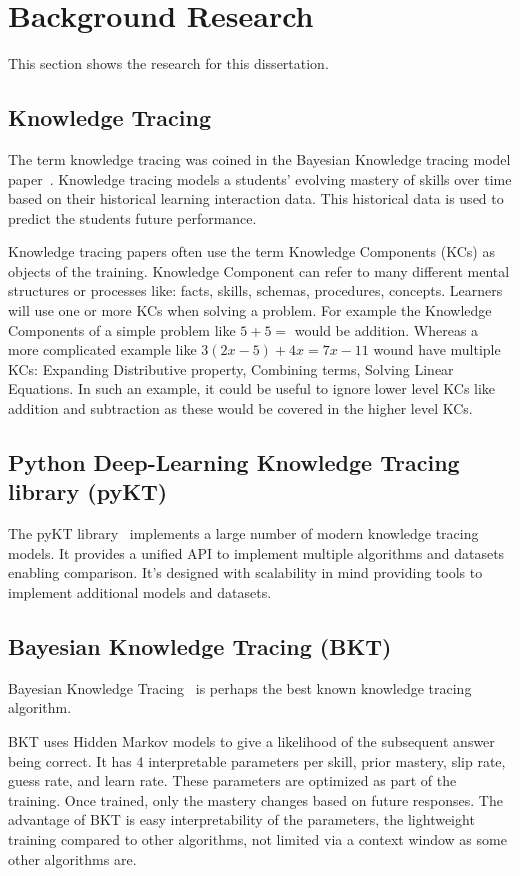 \chapter{Background Research}
This section shows the research for this dissertation.

\section{Knowledge Tracing}
The term knowledge tracing was coined in the Bayesian Knowledge tracing model paper~\autocite{bkt}. Knowledge tracing models a students' evolving mastery of skills over time based on their historical learning interaction data. This historical data is used to predict the students future performance.

Knowledge tracing papers often use the term Knowledge Components (KCs) as objects of the training. Knowledge Component can refer to many different mental structures or processes like: facts, skills, schemas, procedures, concepts. Learners will use one or more KCs when solving a problem. For example the Knowledge Components of a simple problem like $5+5 =$ would be addition. Whereas a more complicated example like $3(2x -5) + 4x = 7x - 11$ wound have multiple KCs: Expanding Distributive property, Combining terms, Solving Linear Equations. In such an example, it could be useful to ignore lower level KCs like addition and subtraction as these would be covered in the higher level KCs.

\section{Python Deep-Learning Knowledge Tracing library (pyKT)}
The pyKT library~\autocite{pyktPaper} implements a large number of modern knowledge tracing models. It provides a unified API to implement multiple algorithms and datasets enabling comparison. It's designed with scalability in mind providing tools to implement additional models and datasets.

\section{Bayesian Knowledge Tracing (BKT)}
Bayesian Knowledge Tracing~\autocite{bkt} is perhaps the best known knowledge tracing algorithm.

BKT uses Hidden Markov models to give a likelihood of the subsequent answer being correct. It has 4 interpretable parameters per skill, prior mastery, slip rate, guess rate, and learn rate. These parameters are optimized as part of the training. Once trained, only the mastery changes based on future responses. The advantage of BKT is easy interpretability of the parameters, the lightweight training compared to other algorithms, not limited via a context window as some other algorithms are.

